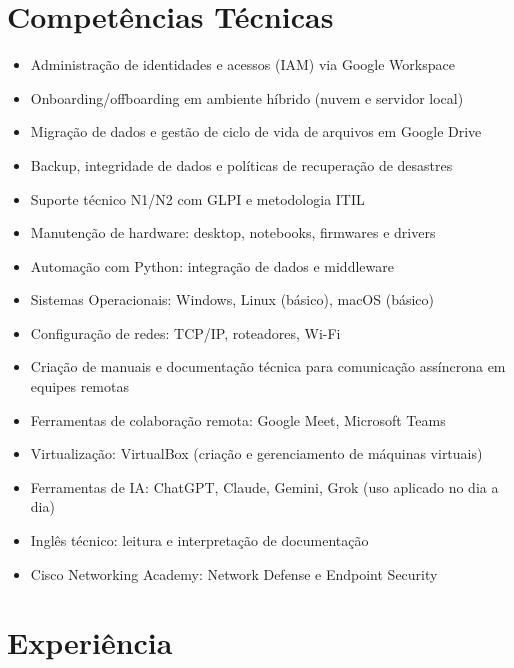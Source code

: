\documentclass[11pt,a4paper]{article}
\begin{document}
\section{Competências Técnicas}
\begin{itemize}
  \item Administração de identidades e acessos (IAM) via Google Workspace
  \item Onboarding/offboarding em ambiente híbrido (nuvem e servidor local)
  \item Migração de dados e gestão de ciclo de vida de arquivos em Google Drive
  \item Backup, integridade de dados e políticas de recuperação de desastres
  \item Suporte técnico N1/N2 com GLPI e metodologia ITIL
  \item Manutenção de hardware: desktop, notebooks, firmwares e drivers
  \item Automação com Python: integração de dados e middleware
  \item Sistemas Operacionais: Windows, Linux (básico), macOS (básico)
  \item Configuração de redes: TCP/IP, roteadores, Wi-Fi
  \item Criação de manuais e documentação técnica para comunicação assíncrona em equipes remotas
  \item Ferramentas de colaboração remota: Google Meet, Microsoft Teams
  \item Virtualização: VirtualBox (criação e gerenciamento de máquinas virtuais)
  \item Ferramentas de IA: ChatGPT, Claude, Gemini, Grok (uso aplicado no dia a dia)
  \item Inglês técnico: leitura e interpretação de documentação
  \item Cisco Networking Academy: Network Defense e Endpoint Security
\end{itemize}

\section{Experiência}
\end{document}
